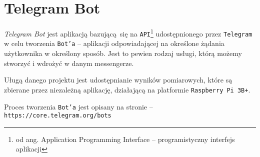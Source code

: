 \section{Telegram Bot}
\textsl{Telegram Bot} jest aplikacją bazującą się na 
\texttt{API}\footnote{od ang. Application Programming Interface -- programistyczny interfejs aplikacji} 
udostępnionego przez \texttt{Telegram} w celu tworzenia \texttt{Bot'a} -- aplikacji odpowiadającej
na określone żądania użytkownika w określony sposób. Jest to pewien rodzaj usługi, którą możemy 
stworzyć i wdrożyć w danym messengerze.

Uługą danego projektu jest udostępnianie wyników pomiarowych, które są zbierane
przez niezależną aplikację, działającą na platformie \texttt{Raspberry Pi 3B+}.

Proces tworzenia \texttt{Bot'a} jest opisany na stronie -- \texttt{https://core.telegram.org/bots}


